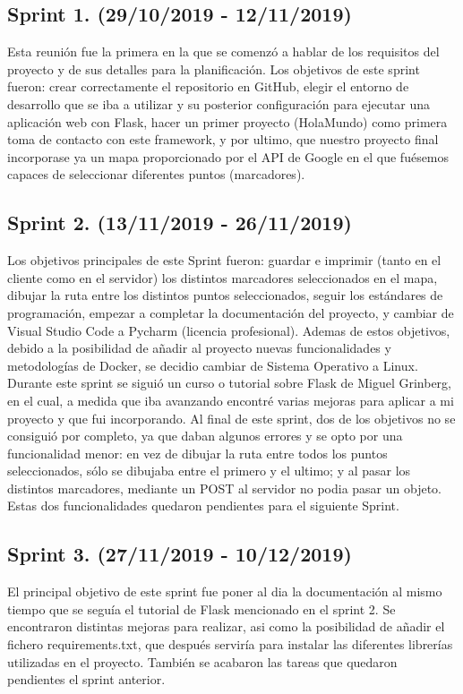\subsection{Sprint 1. (29/10/2019 - 12/11/2019)}
Esta reunión fue la primera en la que se comenzó a hablar de los requisitos del proyecto y de sus detalles para la planificación.
Los objetivos de este sprint fueron: crear correctamente el repositorio en GitHub, elegir el entorno de desarrollo que se iba a utilizar y su posterior configuración para ejecutar una aplicación web con Flask, hacer un primer proyecto (HolaMundo) como primera toma de contacto con este framework, y por ultimo, que nuestro proyecto final incorporase ya un mapa proporcionado por el API de Google en el que fuésemos capaces de seleccionar diferentes puntos (marcadores).


\subsection{Sprint 2. (13/11/2019 - 26/11/2019)}
Los objetivos principales de este Sprint fueron: guardar e imprimir (tanto en el cliente como en el servidor) los distintos marcadores seleccionados en el mapa, dibujar la ruta entre los distintos puntos seleccionados, seguir los estándares de programación, empezar a completar la documentación del proyecto, y cambiar de Visual Studio Code a Pycharm (licencia profesional).
Ademas de estos objetivos, debido a la posibilidad de añadir al proyecto nuevas funcionalidades y metodologías de Docker, se decidio cambiar de Sistema Operativo a Linux.
Durante este sprint se siguió un curso o tutorial sobre Flask de Miguel Grinberg, en el cual, a medida que iba avanzando encontré varias mejoras para aplicar a mi proyecto y que fui incorporando.
Al final de este sprint, dos de los objetivos no se consiguió por completo, ya que daban algunos errores y se opto por una funcionalidad menor: en vez de dibujar la ruta entre todos los puntos seleccionados, sólo se dibujaba entre el primero y el ultimo; y al pasar los distintos marcadores, mediante un POST al servidor no podia pasar un objeto. Estas dos funcionalidades quedaron pendientes para el siguiente Sprint.

\subsection{Sprint 3. (27/11/2019 - 10/12/2019)}
El principal objetivo de este sprint fue poner al dia la documentación al mismo tiempo que se seguía el tutorial de Flask mencionado en el sprint 2.
Se encontraron distintas mejoras para realizar, asi como la posibilidad de añadir el fichero requirements.txt, que después serviría para instalar las diferentes librerías utilizadas en el proyecto.
También se acabaron las tareas que quedaron pendientes el sprint anterior.

